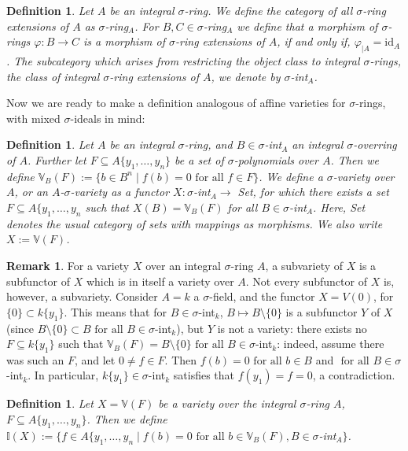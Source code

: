 \documentclass{article}
\def\I{\mathbb{I}}
\def\VV{\mathbb{V}}
\def\s{\sigma}
\def\id{\text{id}}
\def\fa{\text{ for all }}
\theoremstyle{plain}
\newtheorem{defn}[Satz]{Definition}
\theoremstyle{definition}
\newtheorem{rem}[Satz]{Remark}
\begin{document}
\begin{defn}
Let $A$ be an integral $\s$-ring. We define the category of all $\s$-ring extensions of $A$ as $\s$-ring$_A$.
For $B,C \in \s$-ring$_A$ we define that a morphism of $\s$-rings $\varphi: B \rightarrow C$ is a morphism of $\s$-ring extensions of $A$, if and only if, $\varphi_{|A} = \id_A$.
The subcategory which arises from restricting the object class to integral $\s$-rings, the class of integral $\s$-ring extensions of $A$, we denote by $\s$-int$_A$.
\end{defn}

Now we are ready to make a definition analogous of affine varieties for $\s$-rings, with mixed $\s$-ideals in mind:

\begin{defn}
Let $A$ be an integral $\s$-ring, and $B \in \s$-int$_A$ an integral $\s$-overring of $A$. Further let $F \subseteq A\{y_1, \ldots, y_n\}$ be a set of $\s$-polynomials over $A$. 
Then we define $\VV_B(F):= \{ b \in B^n \mid f(b) = 0 \fa f \in F \}$. We define a $\s$-variety over $A$, or an $A$-$\s$-variety as a functor $X: \s$-int$_A \rightarrow$ Set, for which there exists a set $F \subseteq A\{y_1, \ldots, y_n$ such that $X(B) = \VV_B(F)$ for all $B \in \s$-int$_A$.
Here, Set denotes the usual category of sets with mappings as morphisms. We also write $X := \VV(F)$. \index{$\s$-variety}
\end{defn}

\begin{rem}
For a variety $X$ over an integral $\s$-ring $A$, a subvariety of $X$ is a subfunctor of $X$ which is in itself a variety over $A$. Not every subfunctor of $X$ is, however, a subvariety. Consider $A = k$ a $\s$-field,
and the functor $X = V(0)$, for $\{0\} \subset k\{y_1\}$. This means that for $B \in \s$-int$_k$, $B \mapsto B\setminus \{0\}$ is a subfunctor $Y$ of $X$ (since $B \setminus \{ 0 \} \subset B \fa B \in \s$-int$_k$), but $Y$ is not a variety:
there exists no $F \subseteq k\{y_1\}$ such that $\VV_B(F) = B \setminus \{ 0 \} \fa B \in \s$-int$_k$: indeed, assume there was such an $F$, and let $0 \neq f \in F$. Then $f(b) = 0 \fa b \in B$ and $\fa B \in \s$-int$_k$. In particular,
$k\{y_1\} \in \s$-int$_k$ satisfies that $f(y_1) = f = 0$, a contradiction. 
\end{rem}

\begin{defn}
Let $X = \VV(F)$ be a variety over the integral $\s$-ring $A$, $F \subseteq A\{y_1,\ldots,y_n\}$. Then we define $\I(X):= \{ f \in A\{y_1,\ldots,y_n \mid f(b) = 0 \fa b \in \VV_B(F), B \in \s$-int$_A \}$.
\end{defn}
\end{document}

